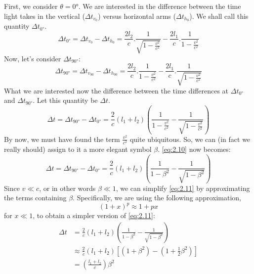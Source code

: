 \documentclass[a4paper,11pt]{article}
\numberwithin{equation}{section}
\begin{document}
 \noindent First, we consider $\theta=\ang{0}$. We are interested in the difference between the time light takes in the vertical ($\Delta t_{v_{0}}$) versus horizontal arms ($\Delta t_{h_{0}}$). We shall call this quantity $\Delta t_{\ang{0}}$.
 \begin{equation} \label{eq:2.8}
 \Delta t_{\ang{0}}=\Delta t_{v_{0}}-\Delta t_{h_{0}}=\frac{2l_{2}}{c}.\frac{1}{\sqrt{1-\frac{v^2}{c^2}}}-\frac{2l_{1}}{c}.\frac{1}{1-\frac{v^2}{c^2}}
 \end{equation} 
 Now, let's consider $\Delta t_{\ang{90}}$:
 \begin{equation} \label{eq:2.9}
 \Delta t_{\ang{90}}=\Delta t_{v_{90}}-\Delta t_{h_{90}}=\frac{2l_{2}}{c}.\frac{1}{1-\frac{v^2}{c^2}}-\frac{2l_{1}}{c}.\frac{1}{\sqrt{1-\frac{v^2}{c^2}}}
 \end{equation}
 \noindent What we are interested now the difference between the time differences at $\Delta t_{\ang{0}}$ and $\Delta t_{\ang{90}}$. Let this quantity be $\Delta t$.
 \begin{equation}\label{eq:2.10}
 \Delta t=\Delta t_{\ang{90}}-\Delta t_{\ang{0}}=\frac{2}{c}(l_{1}+l_{2})\left(\frac{1}{1-\frac{v^2}{c^2}} - \frac{1}{\sqrt{1-\frac{v^2}{c^2}}}\right)
 \end{equation}
 \noindent By now, we must have found the term $\frac{v^2}{c^2}$ quite ubiquitous. So, we can (in fact we really should) assign to it a more elegant symbol $\beta$. \eqref{eq:2.10} now becomes:
 \begin{equation}\label{eq:2.11}
 \Delta t=\Delta t_{\ang{90}}-\Delta t_{\ang{0}}=\frac{2}{c}(l_{1}+l_{2})\left(\frac{1}{1-{\beta}^{2}} - \frac{1}{\sqrt{1-{\beta}^{2}}}\right)
 \end{equation}
 Since $v\ll c$, or in other words $\beta \ll 1$, we can simplify \eqref{eq:2.11} by approximating the terms containing $\beta$. Specifically, we are using the following approximation,
 \begin{equation}\label{eq:2.12}
 (1+x)^{p}\approx1+px
 \end{equation}
 for $x \ll 1$, to obtain a simpler version of \eqref{eq:2.11}:
 \begin{equation}\label{eq:2.13}
 \begin{split}
 \Delta t&=\frac{2}{c}(l_{1}+l_{2})\left(\frac{1}{1-{\beta}^{2}} - \frac{1}{\sqrt{1-{\beta}^{2}}}\right) \\
 &\approx\frac{2}{c}(l_{1}+l_{2})\left[(1+{\beta}^{2}) - \left(1+\frac{1}{2}{\beta}^{2}\right)\right] \\
 &= \left(\frac{l_{1}+l_{2}}{c}\right){\beta}^{2}
 \end{split}
 \end{equation}
\end{document}
